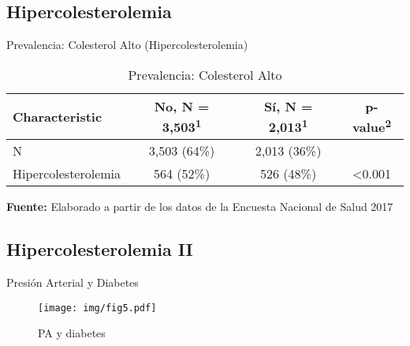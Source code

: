 \documentclass[aspectratio=169]{beamer}
\begin{document}
\subsection*{Hipercolesterolemia}
\begin{frame}{Prevalencia: Colesterol Alto (Hipercolesterolemia)}
    \begin{table}[]
\caption{\small Prevalencia: Colesterol Alto}
    \centering
    \small

    \captionsetup[table]{labelformat=empty,skip=1pt}
\begin{tabular}{lccc}
\toprule
\textbf{Characteristic} & \textbf{No}, N = 3,503\textsuperscript{1} & \textbf{Sí}, N = 2,013\textsuperscript{1} & \textbf{p-value}\textsuperscript{2} \\ 
\midrule
N & 3,503 (64\%) & 2,013 (36\%) &  \\ 
Hipercolesterolemia & 564 (52\%) & 526 (48\%) & <0.001 \\
 \bottomrule
\end{tabular}
    \vspace{5mm}
    
    {\raggedright \small \textbf{Fuente:} Elaborado a partir de los datos de la Encuesta Nacional de Salud 2017 \par}
\end{table}
\end{frame}

\subsection*{Hipercolesterolemia II}
\begin{frame}{Presión Arterial y Diabetes}
    \begin{figure}
        \centering
        \texttt{[image: img/fig5.pdf]}
        \caption{PA y diabetes}
        \label{fig:my_label}
    \end{figure}
\end{frame}
\end{document}
